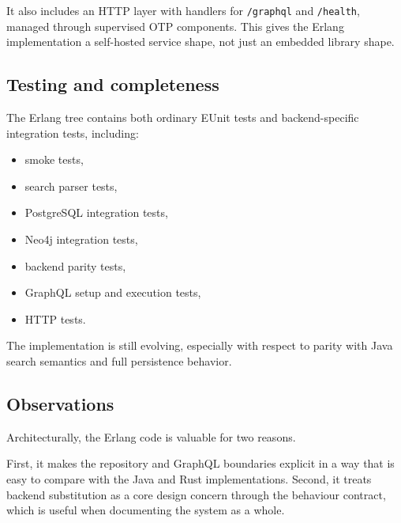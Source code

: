 It also includes an HTTP layer with handlers for \texttt{/graphql} and \texttt{/health}, managed through supervised OTP components. This gives the Erlang implementation a self-hosted service shape, not just an embedded library shape.

\subsection{Testing and completeness}

The Erlang tree contains both ordinary EUnit tests and backend-specific integration tests, including:
\begin{itemize}
\item smoke tests,
\item search parser tests,
\item PostgreSQL integration tests,
\item Neo4j integration tests,
\item backend parity tests,
\item GraphQL setup and execution tests,
\item HTTP tests.
\end{itemize}

The implementation is still evolving, especially with respect to parity with Java search semantics and full persistence behavior. 

\subsection{Observations}

Architecturally, the Erlang code is valuable for two reasons.

First, it makes the repository and GraphQL boundaries explicit in a way that is easy to compare with the Java and Rust implementations. Second, it treats backend substitution as a core design concern through the behaviour contract, which is useful when documenting the system as a whole.
